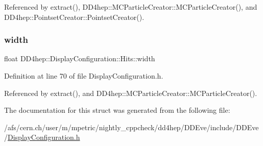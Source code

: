 Referenced by extract(), D\+D4hep\+::\+M\+C\+Particle\+Creator\+::\+M\+C\+Particle\+Creator(), and D\+D4hep\+::\+Pointset\+Creator\+::\+Pointset\+Creator().

\hypertarget{struct_d_d4hep_1_1_display_configuration_1_1_hits_abf1d6b1a1ec5689bd11153429affb607}{}\label{struct_d_d4hep_1_1_display_configuration_1_1_hits_abf1d6b1a1ec5689bd11153429affb607} 
\subsubsection{\texorpdfstring{width}{width}}
{\footnotesize\ttfamily float D\+D4hep\+::\+Display\+Configuration\+::\+Hits\+::width}



Definition at line 70 of file Display\+Configuration.\+h.



Referenced by extract(), and D\+D4hep\+::\+M\+C\+Particle\+Creator\+::\+M\+C\+Particle\+Creator().



The documentation for this struct was generated from the following file\+:\begin{DoxyCompactItemize}
\item 
/afs/cern.\+ch/user/m/mpetric/nightly\+\_\+cppcheck/dd4hep/\+D\+D\+Eve/include/\+D\+D\+Eve/\hyperlink{_display_configuration_8h}{Display\+Configuration.\+h}\end{DoxyCompactItemize}
